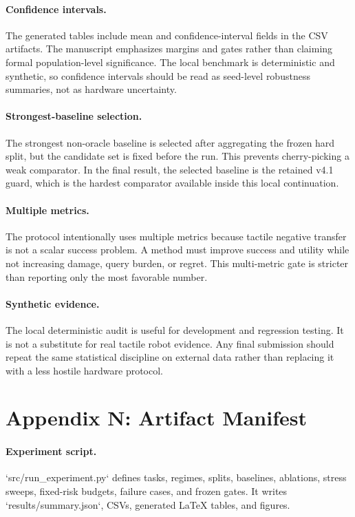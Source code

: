 \documentclass{article}
\begin{document}
\paragraph{Confidence intervals.}
The generated tables include mean and confidence-interval fields in the CSV artifacts. The manuscript emphasizes margins and gates rather than claiming formal population-level significance. The local benchmark is deterministic and synthetic, so confidence intervals should be read as seed-level robustness summaries, not as hardware uncertainty.

\paragraph{Strongest-baseline selection.}
The strongest non-oracle baseline is selected after aggregating the frozen hard split, but the candidate set is fixed before the run. This prevents cherry-picking a weak comparator. In the final result, the selected baseline is the retained v4.1 guard, which is the hardest comparator available inside this local continuation.

\paragraph{Multiple metrics.}
The protocol intentionally uses multiple metrics because tactile negative transfer is not a scalar success problem. A method must improve success and utility while not increasing damage, query burden, or regret. This multi-metric gate is stricter than reporting only the most favorable number.

\paragraph{Synthetic evidence.}
The local deterministic audit is useful for development and regression testing. It is not a substitute for real tactile robot evidence. Any final submission should repeat the same statistical discipline on external data rather than replacing it with a less hostile hardware protocol.

\clearpage
\section{Appendix N: Artifact Manifest}
\paragraph{Experiment script.}
`src/run\_experiment.py` defines tasks, regimes, splits, baselines, ablations, stress sweeps, fixed-risk budgets, failure cases, and frozen gates. It writes `results/summary.json`, CSVs, generated LaTeX tables, and figures.
\end{document}
